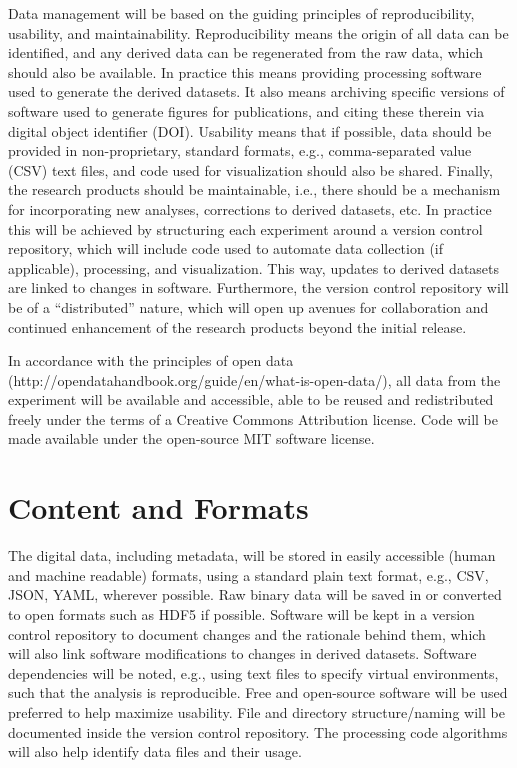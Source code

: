 Data management will be based on the guiding principles of reproducibility,
usability, and maintainability. Reproducibility means the origin of all data can
be identified, and any derived data can be regenerated from the raw data, which
should also be available. In practice this means providing processing software
used to generate the derived datasets. It also means archiving specific versions
of software used to generate figures for publications, and citing these therein
via digital object identifier (DOI). Usability means that if possible, data
should be provided in non-proprietary, standard formats, e.g., comma-separated
value (CSV) text files, and code used for visualization should also be shared.
Finally, the research products should be maintainable, i.e., there should be a
mechanism for incorporating new analyses, corrections to derived datasets, etc.
In practice this will be achieved by structuring each experiment around a
version control repository, which will include code used to automate data
collection (if applicable), processing, and visualization. This way, updates to
derived datasets are linked to changes in software. Furthermore, the version
control repository will be of a “distributed” nature, which will open up avenues
for collaboration and continued enhancement of the research products beyond the
initial release.

In accordance with the principles of open data
(http://opendatahandbook.org/guide/en/what-is-open-data/), all data from the
experiment will be available and accessible, able to be reused and redistributed
freely under the terms of a Creative Commons Attribution license. Code will be
made available under the open-source MIT software license.


\section{Content and Formats}

The digital data, including metadata, will be stored in easily accessible (human
and machine readable) formats, using a standard plain text format, e.g., CSV,
JSON, YAML, wherever possible. Raw binary data will be saved in or converted to
open formats such as HDF5 if possible. Software will be kept in a version
control repository to document changes and the rationale behind them, which will
also link software modifications to changes in derived datasets. Software
dependencies will be noted, e.g., using text files to specify virtual
environments, such that the analysis is reproducible. Free and open-source
software will be used preferred to help maximize usability. File and directory
structure/naming will be documented inside the version control repository. The
processing code algorithms will also help identify data files and their usage.


